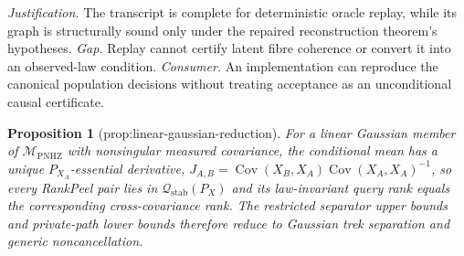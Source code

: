 \documentclass{article}
\newtheorem{proposition}{Proposition}
\begin{document}
\par\smallskip\noindent \textit{Justification.} The transcript is complete for deterministic oracle replay, while its graph is structurally sound only under the repaired reconstruction theorem's hypotheses. \textit{Gap.} Replay cannot certify latent fibre coherence or convert it into an observed-law condition. \textit{Consumer.} An implementation can reproduce the canonical population decisions without treating acceptance as an unconditional causal certificate.

\begin{proposition}[prop:linear-gaussian-reduction]\label{prop:linear-gaussian-reduction}
For a linear Gaussian member of \(\mathcal M_{\mathrm{PNHZ}}\) with nonsingular measured covariance, the conditional mean has a unique \(P_{X_A}\)-essential derivative, \(J_{A,B}=\operatorname{Cov}(X_B,X_A)\operatorname{Cov}(X_A,X_A)^{-1}\), so every RankPeel pair lies in \(\mathcal Q_{\mathrm{stab}}(P_X)\) and its law-invariant query rank equals the corresponding cross-covariance rank. The restricted separator upper bounds and private-path lower bounds therefore reduce to Gaussian trek separation and generic noncancellation.
\end{proposition}
\end{document}
